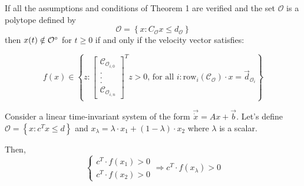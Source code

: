 \begin{corollary}
If all the assumptions and conditions of Theorem 1 are verified and the set 
$\mathcal{O}$ is a polytope defined by
\begin{equation}
    \mathcal{O} = \left\{x : C_{\mathcal{O}}x \leq d_{\mathcal{O}} \right\}
\end{equation}
then $x(t) \notin {\mathcal{O}}^{\circ}$ for $t \geq 0$ if and 
only if the velocity vector satisfies:

\begin{equation}
    f(x) \in \left\{z : \begin{bmatrix}
        \mathcal{C}_{\mathcal{O}_{i,0}}\\
        .\\
        .\\
        .\\
        \mathcal{C}_{\mathcal{O}_{i,n}}
    \end{bmatrix}^T z > 0 \text{, for all }i: \text{row}_i(\mathcal{C}_{\mathcal{O}})
     \cdot x = \Vec{d}_{\mathcal{O}_i} \right\}
\end{equation}
\end{corollary}

\begin{theorem}
Consider a linear time-invariant system of the form $\Vec{\dot x} = Ax + \Vec{b}$.
Let's define $\mathcal{O} = \left\{x : c^T x \leq d \right\}$ and 
$x_{\lambda} = \lambda \cdot x_1 + (1-\lambda) \cdot x_2$ where $\lambda$
is a scalar.

Then,  
\begin{equation}
    \left \{
    \begin{array}{ll}
        c^T \cdot f(x_1) > 0\\
        c^T \cdot f(x_2) > 0
    \end{array}
    \right. \Rightarrow c^T \cdot f(x_\lambda) > 0
\end{equation}

\end{theorem}